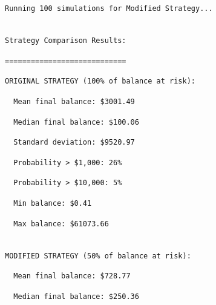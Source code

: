 \documentclass[
  letterpaper,
  DIV=11,
  numbers=noendperiod]{scrartcl}
\begin{document}
\begin{verbatim}
Running 100 simulations for Modified Strategy...
\end{verbatim}

\begin{verbatim}

Strategy Comparison Results:
\end{verbatim}

\begin{verbatim}
============================
\end{verbatim}

\begin{verbatim}
ORIGINAL STRATEGY (100% of balance at risk):
\end{verbatim}

\begin{verbatim}
  Mean final balance: $3001.49
\end{verbatim}

\begin{verbatim}
  Median final balance: $100.06
\end{verbatim}

\begin{verbatim}
  Standard deviation: $9520.97
\end{verbatim}

\begin{verbatim}
  Probability > $1,000: 26%
\end{verbatim}

\begin{verbatim}
  Probability > $10,000: 5%
\end{verbatim}

\begin{verbatim}
  Min balance: $0.41
\end{verbatim}

\begin{verbatim}
  Max balance: $61073.66
\end{verbatim}

\begin{verbatim}

MODIFIED STRATEGY (50% of balance at risk):
\end{verbatim}

\begin{verbatim}
  Mean final balance: $728.77
\end{verbatim}

\begin{verbatim}
  Median final balance: $250.36
\end{verbatim}
\end{document}
